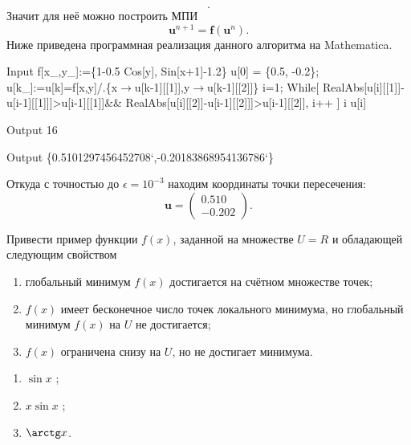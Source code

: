 \documentclass[a4paper]{article}
\begin{document}
\begin{sol}
\[.\] 
Значит для неё можно построить МПИ
\[
	\mathbf{u}^{n+1}=\mathbf{f}\left( \mathbf{u}^n \right) 
.\] 
Ниже приведена программная реализация данного алгоритма
на Mathematica.
\begin{mmaCell}[moredefined={RealAbs,testcell, f, u, i},morepattern={x_, y_, y, x, k_, k}]{Input}
  f[x_,y_]:=\{1-0.5 Cos[y], Sin[x+1]-1.2\}
  u[0] = \{0.5, -0.2\};
  u[k_]:=u[k]=f[x,y]/.\{x\(\pmb{\to}\)u[k-1][[1]],y\(\pmb{\to}\)u[k-1][[2]]\}
  i=1;
  While[
  RealAbs[u[i][[1]]-u[i-1][[1]]]>u[i-1][[1]]&&
  RealAbs[u[i][[2]]-u[i-1][[2]]]>u[i-1][[2]],
  i++
  ]
  i
  u[i]
\end{mmaCell}
\begin{mmaCell}[]{Output}
  16
\end{mmaCell}
\begin{mmaCell}{Output}
  \{0.5101297456452708`,-0.20183868954136786`\}
\end{mmaCell}
Откуда с точностью до $\epsilon=10^{-3}$ находим координаты
точки пересечения:
\[
	\mathbf{u}=\begin{pmatrix} 
	0.510\\ -0.202\end{pmatrix} 
.\] 
\end{sol}
\begin{hiProb}[6.1]
	Привести пример функции $f(x)$, заданной на множестве
	$U=R$ и обладающей следующим свойством
\renewcommand{\labelenumi}{\asbuk{enumi})}
	\begin{enumerate}
		\item глобальный минимум $f(x)$ достигается на
			счётном множестве точек;
		\item  $f(x)$ имеет бесконечное число точек
			локального минимума, но глобальный
			минимум $f(x)$ на $U$ не достигается;
		\item $f(x)$ ограничена снизу на $U$, но не
			достигает минимума.
	\end{enumerate}
\end{hiProb}
\begin{sol}
\renewcommand{\labelenumi}{\asbuk{enumi})}
\begin{enumerate}
\item $\sin x$ ;
\item $x \sin x$ ;
\item $\arctg x$.
\end{enumerate}
\end{sol}
\end{document}
